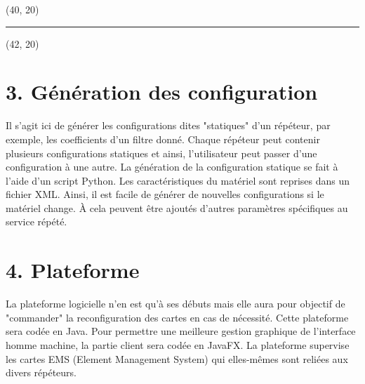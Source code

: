 \documentclass{beamer}
\begin{document}
\begin{textblock}{2}(40, 20)
	\begin{minipage}{0.99\textwidth}
	\begin{center}
	\rule{5pt}{84cm}	
	\end{center}
	\end{minipage}
\end{textblock}
\begin{textblock}{36}(42, 20)
	\begin{minipage}{0.99\textwidth}
	
	\section{3. Génération des configuration}
		Il s'agit ici de générer les configurations dites "statiques" d'un répéteur, par exemple, les coefficients d'un filtre donné. Chaque répéteur peut contenir plusieurs configurations statiques et ainsi, l'utilisateur peut passer d'une configuration à une autre.
		La génération de la configuration statique se fait à l'aide d'un script Python. Les caractéristiques du matériel sont reprises dans un fichier XML. Ainsi, il est facile de générer de nouvelles configurations si le matériel change. À cela peuvent être ajoutés d'autres paramètres spécifiques au service répété.
	
	
	\section{4. Plateforme}
		La plateforme logicielle n'en est qu'à ses débuts mais elle aura pour objectif de "commander" la reconfiguration des cartes en cas de nécessité. Cette plateforme sera codée en Java. Pour permettre une meilleure gestion graphique de l'interface homme machine, la partie client sera codée en JavaFX. La plateforme supervise les cartes EMS (Element Management System) qui elles-mêmes sont reliées aux divers répéteurs.
	\end{minipage}
\end{textblock}
\end{document}
